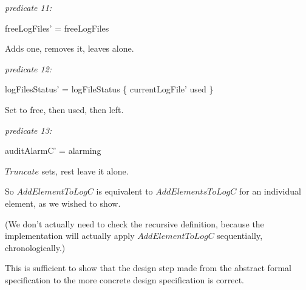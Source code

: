 {\em predicate 11:}
\begin{argue}
	freeLogFiles' = freeLogFiles
\end{argue}
Adds one, removes it, leaves alone.

{\em predicate 12:}
\begin{argue}
	logFilesStatus' = logFileStatus \oplus \{ currentLogFile' \mapsto used \}
\end{argue}
Set to free, then used, then left.

{\em predicate 13:}
\begin{argue}
	auditAlarmC' = alarming
\end{argue}
$Truncate$ sets, rest leave it alone.

So $AddElementToLogC$ is equivalent to $AddElementsToLogC$ for an individual element,
as we wished to show.

(We don't actually need to check the recursive definition,
because the implementation will actually apply $AddElementToLogC$ sequentially,
chronologically.)

This is sufficient to show that the design step made from the abstract
formal specification to the more concrete design specification is correct.
